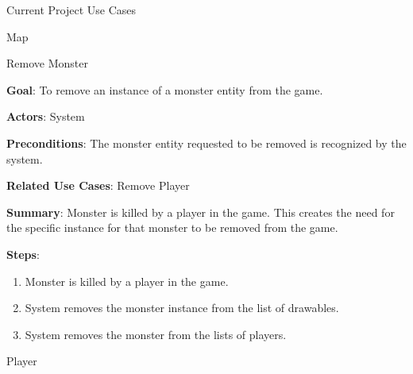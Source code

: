 \documentclass[12pt]{report}
\begin{document}
\begin{chapter}{Current Project Use Cases}
\begin{section}{Map}
    \begin{subsection}{Remove Monster}

      \textbf{Goal}: 
      To remove an instance of a monster entity from the game.

      \textbf{Actors}: 
      System

      \textbf{Preconditions}: 
      The monster entity requested to be removed is recognized by the system.

      \textbf{Related Use Cases}: 
      Remove Player

      \textbf{Summary}: 
      Monster is killed by a player in the game. This creates the need for the specific instance for that monster to be removed from the game.

      \textbf{Steps}:
      \begin{enumerate}
	\item Monster is killed by a player in the game.
	\item System removes the monster instance from the list of drawables.
	\item System removes the monster from the lists of players.
      \end{enumerate}
    \end{subsection}
  \end{section}
  
  \begin{section}{Player}


\end{section}
\end{chapter}
\end{document}
